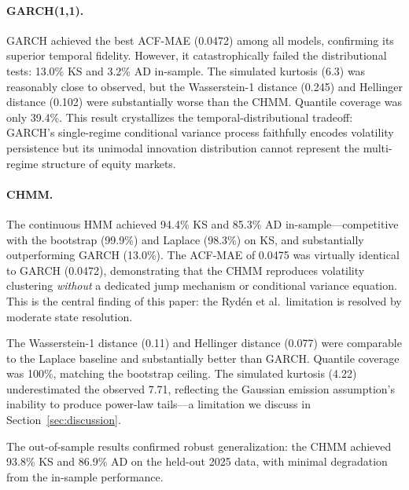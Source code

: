 \paragraph{GARCH(1,1).}
GARCH achieved the best ACF-MAE (0.0472) among all models, confirming its superior temporal fidelity.
However, it catastrophically failed the distributional tests: 13.0\% KS and 3.2\% AD in-sample.
The simulated kurtosis (6.3) was reasonably close to observed, but the Wasserstein-1 distance (0.245) and Hellinger distance (0.102) were substantially worse than the CHMM.
Quantile coverage was only 39.4\%.
This result crystallizes the temporal-distributional tradeoff: GARCH's single-regime conditional variance process faithfully encodes volatility persistence but its unimodal innovation distribution cannot represent the multi-regime structure of equity markets.

\paragraph{CHMM.}
The continuous HMM achieved 94.4\% KS and 85.3\% AD in-sample---competitive with the bootstrap (99.9\%) and Laplace (98.3\%) on KS, and substantially outperforming GARCH (13.0\%).
The ACF-MAE of 0.0475 was virtually identical to GARCH (0.0472), demonstrating that the CHMM reproduces volatility clustering \emph{without} a dedicated jump mechanism or conditional variance equation.
This is the central finding of this paper: the Ryd\'{e}n et al.\ limitation is resolved by moderate state resolution.

The Wasserstein-1 distance (0.11) and Hellinger distance (0.077) were comparable to the Laplace baseline and substantially better than GARCH.
Quantile coverage was 100\%, matching the bootstrap ceiling.
The simulated kurtosis (4.22) underestimated the observed 7.71, reflecting the Gaussian emission assumption's inability to produce power-law tails---a limitation we discuss in Section~\ref{sec:discussion}.

The out-of-sample results confirmed robust generalization: the CHMM achieved 93.8\% KS and 86.9\% AD on the held-out 2025 data, with minimal degradation from the in-sample performance.

